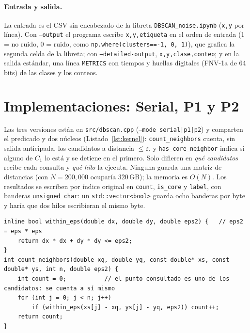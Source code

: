 \documentclass[11pt,letterpaper]{article}
\newcommand{\code}[1]{\texttt{#1}}
\begin{document}
\paragraph{Entrada y salida.} La entrada es el CSV sin encabezado de la libreta \code{DBSCAN\_noise.ipynb}
(\code{x,y} por línea). Con \code{--output} el programa escribe \code{x,y,etiqueta} en el orden de entrada (1 = no
ruido, 0 = ruido, como \code{np.where(clusters==-1, 0, 1)}), que grafica la segunda celda de la libreta; con
\code{--detailed-output}, \code{x,y,clase,conteo}; y en la salida estándar, una línea \code{METRICS} con tiempos y
huellas digitales (FNV-1a de 64 bits) de las clases y los conteos.

\section{Implementaciones: Serial, P1 y P2}\label{sec:impl}

Las tres versiones están en \code{src/dbscan.cpp} (\code{--mode serial|p1|p2}) y comparten el predicado y dos
núcleos (Listado~\ref{lst:kernel}): \code{count\_neighbors} cuenta, sin salida anticipada, los candidatos a distancia
$\le\varepsilon$, y \code{has\_core\_neighbor} indica si alguno de $C_1$ lo está y se detiene en el primero. Solo
difieren en \emph{qué candidatos} recibe cada consulta y \emph{qué hilo} la ejecuta. Ninguna guarda una matriz de
distancias (con $N=200{,}000$ ocuparía 320\,GB); la memoria es $O(N)$. Los resultados se escriben por índice original
en \code{count}, \code{is\_core} y \code{label}, con banderas \code{unsigned char}: un \code{std::vector<bool>}
guarda ocho banderas por byte y haría que dos hilos escribieran el mismo byte.

\begin{lstlisting}[caption={Predicado y núcleo del Paso 1, compartidos por las tres versiones.},label={lst:kernel}]
inline bool within_eps(double dx, double dy, double eps2) {   // eps2 = eps * eps
    return dx * dx + dy * dy <= eps2;
}
int count_neighbors(double xq, double yq, const double* xs, const double* ys, int n, double eps2) {
    int count = 0;           // el punto consultado es uno de los candidatos: se cuenta a sí mismo
    for (int j = 0; j < n; j++)
        if (within_eps(xs[j] - xq, ys[j] - yq, eps2)) count++;
    return count;
}
\end{lstlisting}
\end{document}
